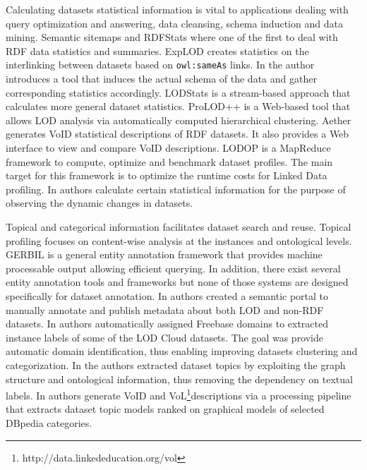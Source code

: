 \documentclass[runningheads,a4paper]{llncs}
\begin{document}
Calculating datasets statistical information is vital to applications dealing with query optimization and answering, data cleansing, schema induction and data mining\cite{profilingWebOfData}\cite{datafinland2}\cite{6690016}. Semantic sitemaps\cite{Cyganiak:2008:SSE:1789394.1789457} and RDFStats\cite{Langegger:2009:RER:1674635.1674691} where one of the first to deal with RDF data statistics and summaries. ExpLOD\cite{Khatchadourian:2010:ESE:2155278.2155300} creates statistics on the interlinking between datasets based on \texttt{owl:sameAs} links. In \cite{semwebprofiling} the author introduces a tool that induces the actual schema of the data and gather corresponding statistics accordingly. LODStats \cite{Auer:2012:LEF:2413941.2413982} is a stream-based approach that calculates more general dataset statistics. ProLOD++\cite{6816740} is a Web-based tool that allows LOD analysis via automatically computed hierarchical clustering\cite{5452762}. Aether\cite{makela-aether-2014} generates VoID statistical descriptions of RDF datasets. It also provides a Web interface to view and compare VoID descriptions. LODOP\cite{forchhammer_profiles_2014} is a MapReduce framework to compute, optimize and benchmark dataset profiles. The main target for this framework is to optimize the runtime costs for Linked Data profiling.  In \cite{DyLDO} authors calculate certain statistical information for the purpose of observing the dynamic changes in datasets.

Topical and categorical information facilitates dataset search and reuse. Topical profiling focuses on content-wise analysis at the instances and ontological levels. GERBIL \cite{gerbil} is a general entity annotation framework that provides machine processable output allowing efficient querying. In addition, there exist several entity annotation tools and frameworks \cite{Cornolti:2013:FBE:2488388.2488411} but none of those systems are designed specifically for dataset annotation. In \cite{datafinalnd} authors created a semantic portal to manually annotate and publish metadata about both LOD and non-RDF datasets. In \cite{6690016} authors automatically assigned Freebase domains to extracted instance labels of some of the LOD Cloud datasets. The goal was provide automatic domain identification, thus enabling improving datasets clustering and categorization. In \cite{Bohm:2012:LTG:2396761.2398718} the authors extracted dataset topics by exploiting the graph structure and ontological information, thus removing the dependency on textual labels. In \cite{scalableApproach} authors generate VoID and VoL\footnote{http://data.linkededucation.org/vol }descriptions via a processing pipeline that extracts dataset topic models ranked on graphical models of selected DBpedia categories.
\end{document}
